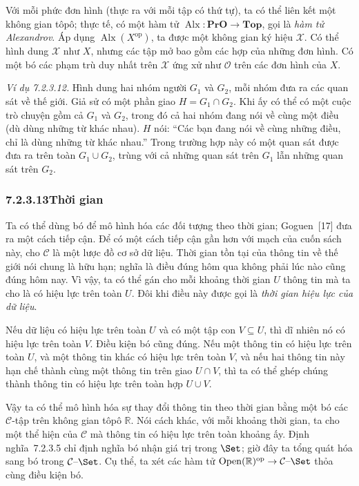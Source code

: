 Với mỗi phức đơn hình (thực ra với mỗi tập có thứ tự), ta có thể liên kết một không gian tôpô; thực tế, có một hàm tử $\operatorname{Alx}:\mathbf{PrO}\to\mathbf{Top}$, gọi là \emph{hàm tử Alexandrov}. Áp dụng $\operatorname{Alx}(X^{\mathrm{op}})$, ta được một không gian ký hiệu $\mathcal X$. Có thể hình dung $\mathcal X$ như $X$, nhưng các tập mở bao gồm các hợp của những đơn hình. Có một bó các phạm trù duy nhất trên $\mathcal X$ ứng xử như $\mathcal O$ trên các đơn hình của $X$.

\noindent\textit{Ví dụ 7.2.3.12.}\keepwithnext
Hình dung hai nhóm người $G_1$ và $G_2$, mỗi nhóm đưa ra các quan sát về thế giới. Giả sử có một phần giao $H=G_1\cap G_2$. Khi ấy có thể có một cuộc trò chuyện gồm cả $G_1$ và $G_2$, trong đó cả hai nhóm đang nói về cùng một điều (dù dùng những từ khác nhau). $H$ nói: ``Các bạn đang nói về cùng những điều,
chỉ là dùng những từ khác nhau.'' Trong trường hợp này có một quan sát được đưa ra trên toàn $G_1\cup G_2$, trùng với cả những quan sát trên $G_1$ lẫn những quan sát trên $G_2$.

\subsubsection*{7.2.3.13\quad Thời gian}
Ta có thể dùng bó để mô hình hóa các đối tượng theo thời gian; Goguen~[17] đưa ra một cách tiếp cận. Để có một cách tiếp cận gần hơn với mạch của cuốn sách này, cho $\mathcal C$ là một lược đồ cơ sở dữ liệu. Thời gian tồn tại của thông tin về thế giới nói chung là hữu hạn; nghĩa là điều đúng hôm qua không phải lúc nào cũng đúng hôm nay. Vì vậy, ta có thể gán cho mỗi khoảng thời gian $U$ thông tin mà ta cho là có hiệu lực trên toàn $U$. Đôi khi điều này được gọi là \emph{thời gian hiệu lực của dữ liệu}.

Nếu dữ liệu có hiệu lực trên toàn $U$ và có một tập con $V\subseteq U$, thì dĩ nhiên nó có hiệu lực trên toàn $V$. Điều kiện bó cũng đúng. Nếu một thông tin có hiệu lực trên toàn $U$, và một thông tin khác có hiệu lực trên toàn $V$, và nếu hai thông tin này hạn chế thành cùng một thông tin trên giao $U\cap V$, thì ta có thể ghép chúng thành thông tin có hiệu lực trên toàn hợp $U\cup V$.

Vậy ta có thể mô hình hóa sự thay đổi thông tin theo thời gian bằng một bó các $\mathcal C$-tập trên không gian tôpô $\mathbb R$. Nói cách khác, với mỗi khoảng thời gian, ta cho một thể hiện của $\mathcal C$ mà thông tin có hiệu lực trên toàn khoảng ấy. Định nghĩa~7.2.3.5 chỉ định nghĩa bó nhận giá trị trong $\Set$; giờ đây ta tổng quát hóa sang bó trong $\mathcal C\text{--}\Set$. Cụ thể, ta xét các hàm tử $\operatorname{Open}(\mathbb R)^{\mathrm{op}}\to\mathcal C\text{--}\Set$ thỏa cùng điều kiện bó.

